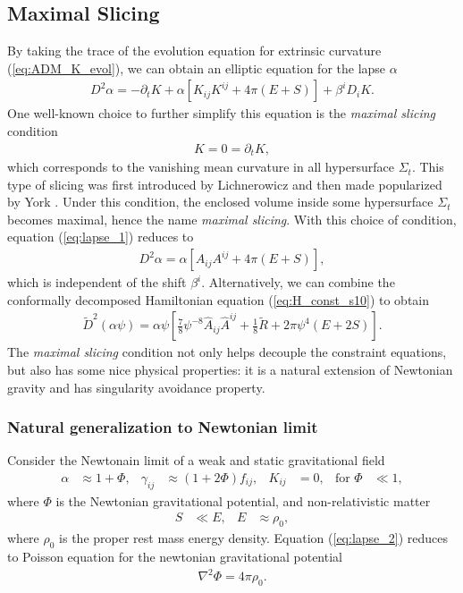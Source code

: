 \subsection{Maximal Slicing} 
\label{section1.4.1}
By taking the trace of the evolution equation for extrinsic curvature (\ref{eq:ADM_K_evol}),
we can obtain an elliptic equation for the lapse $\alpha$
\begin{align}\label{eq:lapse_1}
    D^2 \alpha = - \partial_t K + \alpha \left[ K_{ij} K^{ij} + 4\pi\left(E+S\right) \right] + \beta^i D_i K.
\end{align}
One well-known choice to further simplify this equation is the \textit{maximal slicing} condition
\begin{align}\label{eq:max_slicing}
    K = 0 = \partial_t K,
\end{align}
which corresponds to the vanishing mean curvature in all hypersurface $\Sigma_t$.
This type of slicing was first introduced by Lichnerowicz \cite{lichnerowicz1944integration}
and then made popularized by York \cite{smarr1979sources,smarr1978radiation}.
Under this condition, the enclosed volume inside some hypersurface $\Sigma_t$ becomes maximal,
hence the name \textit{maximal slicing}.
With this choice of condition, equation (\ref{eq:lapse_1}) reduces to
\begin{align}\label{eq:lapse_2}
    D^2 \alpha = \alpha \left[ A_{ij} A^{ij} + 4\pi\left(E+S\right) \right],
\end{align}
which is independent of the shift $\beta^i$.
Alternatively, we can combine the conformally decomposed Hamiltonian equation (\ref{eq:H_const_s10}) to obtain
\begin{align}\label{eq:lapse_con}
    \tilde{D}^2 \left(\alpha \psi \right) = \alpha \psi \left[ \frac{7}{8} \psi^{-8} \hat{A}_{ij} \hat{A}^{ij} + \frac{1}{8} \tilde{R}
    + 2 \pi \psi^4 \left(E + 2 S \right) \right].
\end{align}
The \textit{maximal slicing} condition not only helps decouple the constraint equations,
but also has some nice physical properties:
it is a natural extension of Newtonian gravity and has singularity avoidance property.

\subsubsection{Natural generalization to Newtonian limit}
Consider the Newtonain limit of a weak and static gravitational field
\begin{align}
    \alpha &\approx 1 + \Phi, & \gamma_{ij} &\approx \left(1 + 2\Phi \right) f_{ij}, & K_{ij} &=0, & \text{for } \Phi &\ll 1,
\end{align}
where $\Phi$ is the Newtonian gravitational potential,
and non-relativistic matter
\begin{align}
    S &\ll E, & E &\approx \rho_0,
\end{align}
where $\rho_0$ is the proper rest mass energy density.
Equation (\ref{eq:lapse_2}) reduces to Poisson equation for the newtonian gravitational potential
\begin{align}
    \nabla^2 \Phi = 4\pi \rho_0.
\end{align}

